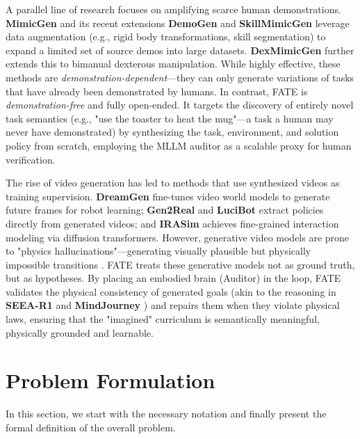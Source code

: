\documentclass{article}
\theoremstyle{plain}
\theoremstyle{definition}
\theoremstyle{remark}
\begin{document}
A parallel line of research focuses on amplifying scarce human demonstrations. \textbf{MimicGen} \cite{mimicgen_2023} and its recent extensions \textbf{DemoGen} \cite{demogen_2025} and \textbf{SkillMimicGen} \cite{garrett2024skillmimicgen} leverage data augmentation (e.g., rigid body transformations, skill segmentation) to expand a limited set of source demos into large datasets. \textbf{DexMimicGen} \cite{jiang2025dexmimicgen} further extends this to bimanual dexterous manipulation. 
While highly effective, these methods are \textit{demonstration-dependent}—they can only generate variations of tasks that have already been demonstrated by humans. In contrast, FATE is \textit{demonstration-free} and fully open-ended. It targets the discovery of entirely novel task semantics (e.g., "use the toaster to heat the mug"—a task a human may never have demonstrated) by synthesizing the task, environment, and solution policy from scratch, employing the MLLM auditor as a scalable proxy for human verification.


The rise of video generation has led to methods that use synthesized videos as training supervision. \textbf{DreamGen} \cite{dreamgen_2025} fine-tunes video world models to generate future frames for robot learning; \textbf{Gen2Real} \cite{gen2real_2025} and \textbf{LuciBot} \cite{lucibot_2025} extract policies directly from generated videos; and \textbf{IRASim} \cite{zhu2025irasim} achieves fine-grained interaction modeling via diffusion transformers. 
However, generative video models are prone to "physics hallucinations"—generating visually plausible but physically impossible transitions \cite{vid2world2025}. FATE treats these generative models not as ground truth, but as hypotheses. By placing an embodied brain (Auditor) in the loop, FATE validates the physical consistency of generated goals (akin to the reasoning in \textbf{SEEA-R1} \cite{seear1_2025} and \textbf{MindJourney} \cite{mindjourney_2025}) and repairs them when they violate physical laws, ensuring that the "imagined" curriculum is semantically meaningful, physically grounded and learnable.


\section{Problem Formulation}
\label{sec:problem_formulation}
In this section, we start with the necessary notation and finally present the formal definition of the overall problem.
\end{document}
